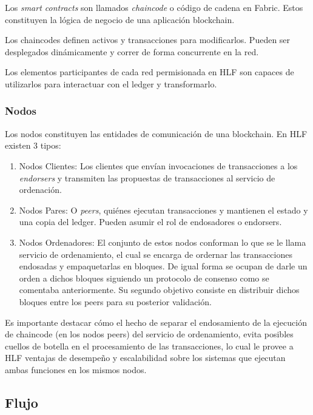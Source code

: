 Los \emph{smart contracts} son llamados \emph{chaincode} o c\'odigo de cadena en Fabric. Estos constituyen la l\'ogica de negocio de una aplicaci\'on blockchain. 

Los chaincodes definen activos y transacciones para modificarlos. Pueden ser desplegados din\'amicamente y correr de forma concurrente en la red.

Los elementos participantes de cada red permisionada en HLF son capaces de utilizarlos para interactuar con el ledger y transformarlo.

\subsubsection{Nodos}

Los nodos constituyen las entidades de comunicaci\'on de una blockchain. En HLF existen 3 tipos:

\begin{enumerate}
	\item Nodos Clientes: Los clientes que env\'ian invocaciones de transacciones a los \emph{endorsers} y transmiten las propuestas de transacciones al servicio de ordenaci\'on.
	
	
	\item Nodos Pares: O \emph{peers}, qui\'enes ejecutan transacciones y mantienen el estado y una copia del ledger. Pueden asumir el rol de endosadores o endorsers.
	
	\item Nodos Ordenadores: El conjunto de estos nodos conforman lo que se le llama servicio de ordenamiento, el cual se encarga de ordernar las transacciones endosadas y empaquetarlas en bloques. De igual forma se ocupan de darle un orden a dichos bloques siguiendo un protocolo de consenso como se comentaba anteriormente. Su segundo objetivo consiste en distribuir dichos bloques entre los peers para su posterior validaci\'on.
	
\end{enumerate}

Es importante destacar c\'omo el hecho de separar el endosamiento de la ejecuci\'on de chaincode (en los nodos peers) del servicio de ordenamiento, evita posibles cuellos de botella en el procesamiento de las transacciones, lo cual le provee a HLF ventajas de desempe\~no y escalabilidad sobre los sistemas que ejecutan ambas funciones en los mismos nodos.
 
\subsection{Flujo}

